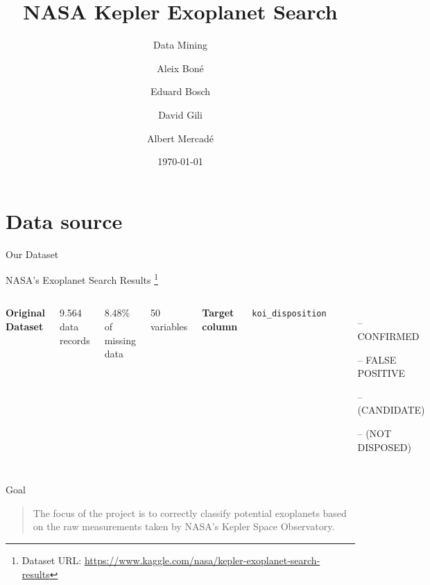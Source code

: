 \documentclass[aspectratio=169]{beamer}
\title{NASA Kepler Exoplanet Search}
\subtitle{Data Mining}
\date{\today}
\author{
Aleix Boné \and
Eduard Bosch \and
David Gili \and
Albert Mercadé
}
\institute{UPC}
\begin{document}
  \maketitle
  
\section{Data source}
\begin{frame}{Our Dataset}
\begin{center}
    NASA's Exoplanet Search Results \footnote[frame]{Dataset URL: \url{https://www.kaggle.com/nasa/kepler-exoplanet-search-results}}
\vspace{5 mm}

\begin{columns}[t]
    
    \large
    \textbf{Original Dataset}
    
    \small
    
    9.564 data records
    
    8.48\% of missing data
    
    50 variables
    
    \large
    \textbf{Target column}
    
    \footnotesize
    \texttt{koi\_disposition}
    
    \begin{itemize}
        \itemsep0.05em
        \item[--] CONFIRMED
        \item[--] FALSE POSITIVE
        \item[--] (CANDIDATE)
        \item[--] (NOT DISPOSED)
    \end{itemize}
   
\end{columns}

\end{center}
\end{frame}


\begin{frame}{Goal}
\begin{quote}
The focus of the project is to correctly classify potential exoplanets based
on the raw measurements taken by NASA's Kepler Space Observatory.
\end{quote}
\end{frame}  
\end{document}
